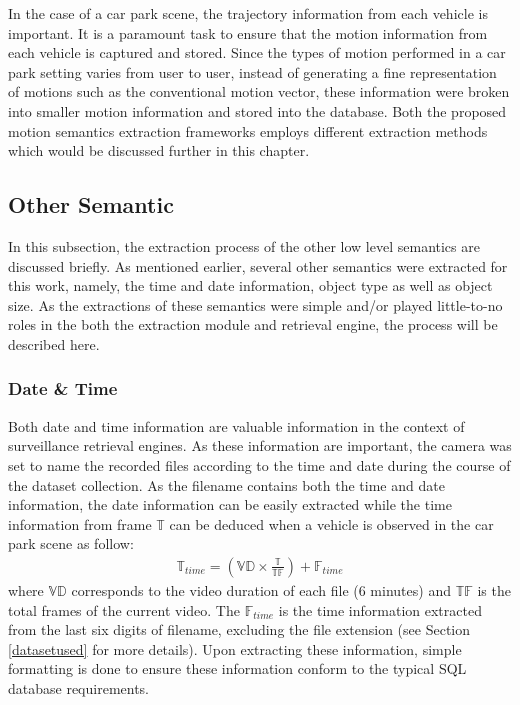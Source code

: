 In the case of a car park scene, the trajectory information from each vehicle is important. It is a paramount task to ensure that the motion information from each vehicle is captured and stored. Since the types of motion performed in a car park setting varies from user to user, instead of generating a fine representation of motions such as the conventional motion vector, these information were broken into smaller motion information and stored into the database. Both the proposed motion semantics extraction frameworks employs different extraction methods which would be discussed further in this chapter.






\subsection{Other Semantic}

In this subsection, the extraction process of the other low level semantics are discussed briefly. As mentioned earlier, several other semantics were extracted for this work, namely, the time and date information, object type as well as object size. As the extractions of these semantics were simple and/or played little-to-no roles in the both the extraction module and retrieval engine, the process will be described here.

\subsubsection{Date \& Time}

Both date and time information are valuable information in the context of surveillance retrieval engines. As these information are important, the camera was set to name the recorded files according to the time and date during the course of the dataset collection. As the filename contains both the time and date information, the date information can be easily extracted while the time information from frame $\mathbb{T}$ can be deduced when a vehicle is observed in the car park scene as follow: 
\begin{align}
    \mathbb{T}_{time}  = (\mathbb{VD} \times \frac{\mathbb{T}}{\mathbb{TF}}) + \mathbb{F}_{time}
\end{align}
where $\mathbb{VD}$ corresponds to the video duration of each file (6 minutes) and $\mathbb{TF}$ is the total frames of the current video. The $\mathbb{F}_{time}$ is the time information extracted from the last six digits of filename, excluding the file extension (see Section \ref{datasetused} for more details). Upon extracting these information, simple formatting is done to ensure these information conform to the typical SQL database requirements.

